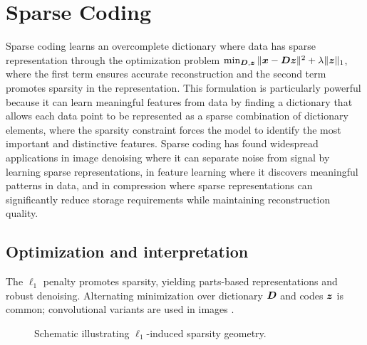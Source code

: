 
\section{Sparse Coding }
\label{sec:sparse-coding}

Sparse coding learns an overcomplete dictionary where data has sparse representation through the optimization problem $\min_{\boldsymbol{D}, \boldsymbol{z}} \|\boldsymbol{x} - \boldsymbol{D}\boldsymbol{z}\|^2 + \lambda \|\boldsymbol{z}\|_1$, where the first term ensures accurate reconstruction and the second term promotes sparsity in the representation. This formulation is particularly powerful because it can learn meaningful features from data by finding a dictionary that allows each data point to be represented as a sparse combination of dictionary elements, where the sparsity constraint forces the model to identify the most important and distinctive features. Sparse coding has found widespread applications in image denoising where it can separate noise from signal by learning sparse representations, in feature learning where it discovers meaningful patterns in data, and in compression where sparse representations can significantly reduce storage requirements while maintaining reconstruction quality.

\subsection{Optimization and interpretation}

The $\ell_1$ penalty promotes sparsity, yielding parts-based representations and robust denoising. Alternating minimization over dictionary $\boldsymbol{D}$ and codes $\boldsymbol{z}$ is common; convolutional variants are used in images \textcite{GoodfellowEtAl2016}.

\begin{figure}[h]
  \centering
  \caption{Schematic illustrating $\ell_1$-induced sparsity geometry.}
  \label{fig:l1-geometry}
\end{figure}
